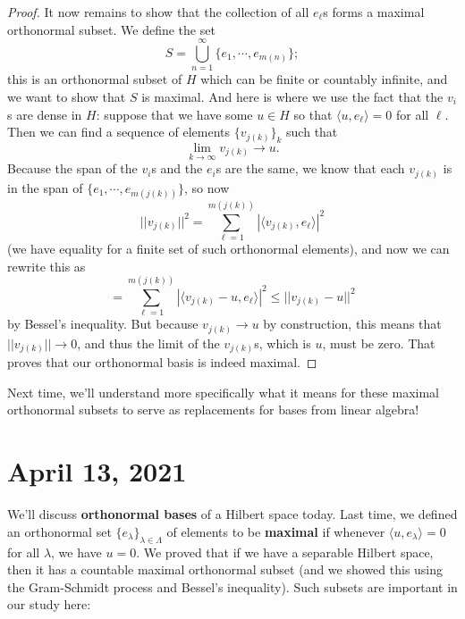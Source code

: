 \begin{proof}
It now remains to show that the collection of all $e_\ell$s forms a maximal orthonormal subset. We define the set 
\[
    S = \bigcup_{n=1}^{\infty} \{e_1, \cdots, e_{m(n)}\};
\]
this is an orthonormal subset of $H$ which can be finite or countably infinite, and we want to show that $S$ is maximal. And here is where we use the fact that the $v_i$s are dense in $H$: suppose that we have some $u \in H$ so that $\langle u, e_\ell \rangle = 0$ for all $\ell$. Then we can find a sequence of elements $\{v_{j(k)}\}_k$ such that 
\[
    \lim_{k \to \infty} v_{j(k)} \to u.
\]
Because the span of the $v_i$s and the $e_i$s are the same, we know that each $v_{j(k)}$ is in the span of $\{e_1, \cdots, e_{m(j(k))}\}$, so now 
\[
    \boxed{||v_{j(k)}||^2} = \sum_{\ell = 1}^{m(j(k))} |\langle v_{j(k)}, e_\ell \rangle|^2
\]
(we have equality for a finite set of such orthonormal elements), and now we can rewrite this as 
\[
    = \sum_{\ell = 1}^{m(j(k))} |\langle v_{j(k)} - u, e_\ell \rangle|^2 \le \boxed{||v_{j(k)} - u||^2}
\]
by Bessel's inequality. But because $v_{j(k)} \to u$ by construction, this means that $||v_{j(k)}|| \to 0$, and thus the limit of the $v_{j(k)}$s, which is $u$, must be zero. That proves that our orthonormal basis is indeed maximal.
\end{proof}

Next time, we'll understand more specifically what it means for these maximal orthonormal subsets to serve as replacements for bases from linear algebra!



\pagebreak\section*{April 13, 2021}

We'll discuss \textbf{orthonormal bases} of a Hilbert space today. Last time, we defined an orthonormal set $\{e_{\lambda}\}_{\lambda \in \Lambda}$ of elements to be \textbf{maximal} if whenever $\langle u, e_\lambda \rangle = 0$ for all $\lambda$, we have $u = 0$. We proved that if we have a separable Hilbert space, then it has a countable maximal orthonormal subset (and we showed this using the Gram-Schmidt process and Bessel's inequality). Such subsets are important in our study here:


